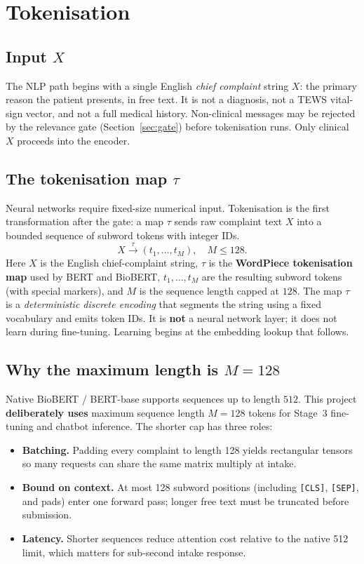 \section{Tokenisation}
\label{sec:tokenisation}

\subsection{Input \(X\)}

The NLP path begins with a single English \emph{chief complaint} string \(X\): the primary reason the patient presents, in free text. It is not a diagnosis, not a TEWS vital-sign vector, and not a full medical history. Non-clinical messages may be rejected by the relevance gate (Section~\ref{sec:gate}) before tokenisation runs. Only clinical \(X\) proceeds into the encoder.

\subsection{The tokenisation map \(\tau\)}

Neural networks require fixed-size numerical input. Tokenisation is the first transformation after the gate: a map \(\tau\) sends raw complaint text \(X\) into a bounded sequence of subword tokens with integer IDs.
\begin{equation}
  X \xrightarrow{\tau} (t_1, \ldots, t_M), \quad M \leq 128.
  \label{eq:tau-map}
\end{equation}
Here \(X\) is the English chief-complaint string, \(\tau\) is the \textbf{WordPiece tokenisation map} used by BERT and BioBERT, \(t_1,\ldots,t_M\) are the resulting subword tokens (with special markers), and \(M\) is the sequence length capped at \(128\). The map \(\tau\) is a \emph{deterministic discrete encoding} that segments the string using a fixed vocabulary and emits token IDs. It is \textbf{not} a neural network layer; it does not learn during fine-tuning. Learning begins at the embedding lookup that follows.

\subsection{Why the maximum length is \(M = 128\)}

Native BioBERT / BERT-base supports sequences up to length \(512\). This project \textbf{deliberately uses} maximum sequence length \(M = 128\) tokens for Stage~3 fine-tuning and chatbot inference. The shorter cap has three roles:
\begin{itemize}
\item \textbf{Batching.} Padding every complaint to length 128 yields rectangular tensors so many requests can share the same matrix multiply at intake.
\item \textbf{Bound on context.} At most 128 subword positions (including \texttt{[CLS]}, \texttt{[SEP]}, and pads) enter one forward pass; longer free text must be truncated before submission.
\item \textbf{Latency.} Shorter sequences reduce attention cost relative to the native 512 limit, which matters for sub-second intake response.
\end{itemize}

